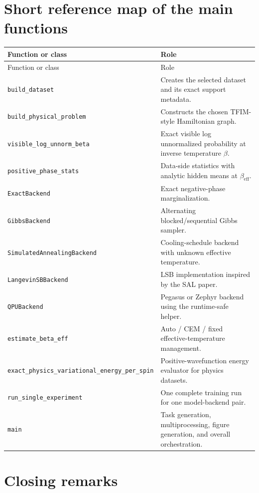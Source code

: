 \documentclass[11pt]{article}
\begin{document}
\section{Short reference map of the main functions}

\begin{center}
\begin{longtable}{>{\ttfamily\raggedright\arraybackslash}p{} p{}}
\toprule
Function or class & Role \\
\midrule
\endfirsthead
\toprule
Function or class & Role \\
\midrule
\endhead
\texttt{build\_dataset} & Creates the selected dataset and its exact support metadata. \\
\texttt{build\_physical\_problem} & Constructs the chosen TFIM-style Hamiltonian graph. \\
\texttt{visible\_log\_unnorm\_beta} & Exact visible log unnormalized probability at inverse temperature $\beta$. \\
\texttt{positive\_phase\_stats} & Data-side statistics with analytic hidden means at $\beta_{\mathrm{eff}}$. \\
\texttt{ExactBackend} & Exact negative-phase marginalization. \\
\texttt{GibbsBackend} & Alternating blocked/sequential Gibbs sampler. \\
\texttt{SimulatedAnnealingBackend} & Cooling-schedule backend with unknown effective temperature. \\
\texttt{LangevinSBBackend} & LSB implementation inspired by the SAL paper. \\
\texttt{QPUBackend} & Pegasus or Zephyr backend using the runtime-safe helper. \\
\texttt{estimate\_beta\_eff} & Auto / CEM / fixed effective-temperature management. \\
\texttt{exact\_physics\_variational\_energy\_per\_spin} & Positive-wavefunction energy evaluator for physics datasets. \\
\texttt{run\_single\_experiment} & One complete training run for one model-backend pair. \\
\texttt{main} & Task generation, multiprocessing, figure generation, and overall orchestration. \\
\bottomrule
\end{longtable}
\end{center}

\section{Closing remarks}
\end{document}
